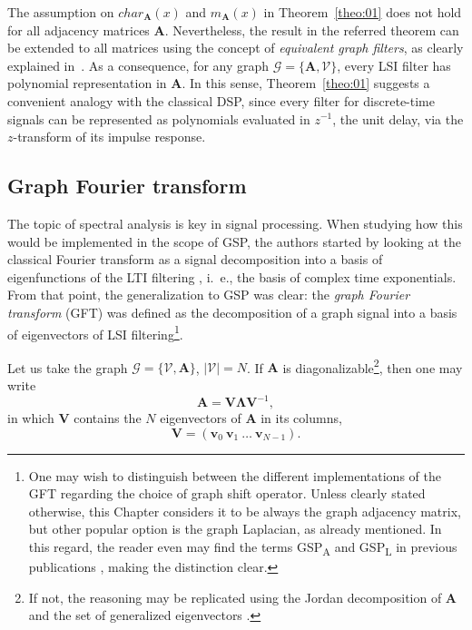 The assumption on $char_{\mathbf{A}}(x)$ and $m_{\mathbf{A}}(x)$ in Theorem~\ref{theo:01} does not hold for all adjacency matrices $\mathbf{A}$. Nevertheless, the result in the referred theorem can be extended to all matrices using the concept of \emph{equivalent graph filters}, as clearly explained in~\cite{sandryhaila2013filters}. As a consequence, for any graph $\mathcal{G} = \{\mathbf{A}, \mathcal{V}\}$, every LSI filter has polynomial representation in $\mathbf{A}$. In this sense, Theorem~\ref{theo:01} suggests a convenient analogy with the classical DSP, since every filter for discrete-time signals can be represented as polynomials evaluated in $ z^{-1} $, the unit delay, via the $z$-transform of its impulse response.

\subsection{Graph Fourier transform}

The topic of spectral analysis is key in signal processing. When studying how this would be implemented in the scope of GSP, the authors started by looking at the classical Fourier transform as a signal decomposition into a basis of eigenfunctions of the LTI filtering \cite{oppenheim1997signals}, i.~e., the basis of complex time exponentials. From that point, the generalization to GSP was clear: the \emph{graph Fourier transform} (GFT) was defined as the decomposition of a graph signal into a basis of eigenvectors of LSI filtering\footnote{One may wish to distinguish between the different implementations of the GFT regarding the choice of graph shift operator. Unless clearly stated otherwise, this Chapter considers it to be always the graph adjacency matrix, but other popular option is the graph Laplacian, as already mentioned. In this regard, the reader even may find the terms GSP\textsubscript{A} and GSP\textsubscript{L} in previous publications \cite{ribeiro2018}, making the distinction clear.}.

Let us take the graph $ \mathcal{G} = \{\mathcal{V}, \mathbf{A}\} $, $ |\mathcal{V}| =N $. If $ \mathbf{A} $ is diagonalizable\footnote{If not, the reasoning may be replicated using the Jordan decomposition of $ \mathbf{A} $ and the set of generalized eigenvectors \cite{deri2017spectral}.}, then one may write
\begin{equation}\label{eq:gft_01}
\mathbf{A} = \mathbf{V} \mathbf{\Lambda} \mathbf{V}^{-1},
\end{equation}
in which $ \mathbf{V} $ contains the $ N $ eigenvectors of $ \mathbf{A} $ in its columns,
\begin{equation}\label{eq:gft_02}
\mathbf{V} = (\mathbf{v}_0 \ \mathbf{v}_1 \ \dots\ \mathbf{v}_{N-1}).
\end{equation}

